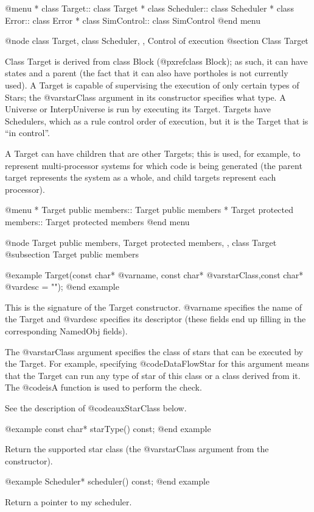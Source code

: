@menu
* class Target::    class Target
* class Scheduler::  class Scheduler
* class Error::     class Error
* class SimControl::  class SimControl
@end menu

@node class Target, class Scheduler,  , Control of execution
@section Class Target

Class Target is derived from class Block (@pxref{class Block});
as such, it can have states
and a parent (the fact that it can also have portholes is not currently
used).  A Target is capable of supervising the execution of only certain
types of Stars; the @var{starClass} argument in its constructor
specifies what type.  A Universe or InterpUniverse is run by executing
its Target.  Targets have Schedulers, which as a rule control order of
execution, but it is the Target that is ``in control''.

A Target can have children that are other Targets; this is used, for
example, to represent multi-processor systems for which code is being
generated (the parent target represents the system as a whole, and
child targets represent each processor).

@menu
* Target public members::  Target public members
* Target protected members::  Target protected members
@end menu

@node Target public members, Target protected members,  , class Target
@subsection Target public members

@example
Target(const char* @var{name}, const char* @var{starClass},const char* @var{desc} = "");
@end example

This is the signature of the Target constructor. @var{name} specifies
the name of the Target and @var{desc} specifies its descriptor (these
fields end up filling in the corresponding NamedObj fields).

The @var{starClass} argument specifies the class of stars that can be
executed by the Target.  For example, specifying @code{DataFlowStar}
for this argument means that the Target can run any type of star of
this class or a class derived from it.  The @code{isA} function is
used to perform the check.

See the description of @code{auxStarClass} below.

@example
const char* starType() const;
@end example

Return the supported star class (the @var{starClass} argument from
the constructor).

@example
Scheduler* scheduler() const;
@end example

Return a pointer to my scheduler.

